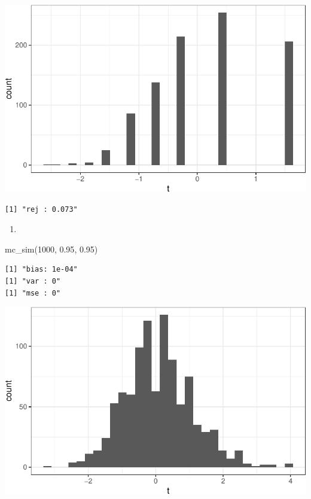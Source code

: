 \documentclass[
  letterpaper,
  DIV=11,
  numbers=noendperiod]{scrreprt}
\newenvironment{Shaded}{\begin{snugshade}}{\end{snugshade}}
\newcommand{\DecValTok}[1]{\textcolor[rgb]{0.68,0.00,0.00}{#1}}
\newcommand{\FloatTok}[1]{\textcolor[rgb]{0.68,0.00,0.00}{#1}}
\newcommand{\FunctionTok}[1]{\textcolor[rgb]{0.28,0.35,0.67}{#1}}
\newcommand{\NormalTok}[1]{\textcolor[rgb]{0.00,0.23,0.31}{#1}}
\providecommand{\tightlist}{%
  \setlength{\itemsep}{0pt}\setlength{\parskip}{0pt}}\usepackage{longtable,booktabs,array}
\begin{document}
\includegraphics{03-estimators_files/figure-pdf/unnamed-chunk-17-1.pdf}

\begin{verbatim}
[1] "rej : 0.073"
\end{verbatim}

\begin{enumerate}
\def\labelenumi{\arabic{enumi}.}
\setcounter{enumi}{9}
\tightlist
\item
\end{enumerate}

\begin{Shaded}
\begin{Highlighting}[]
\FunctionTok{mc\_sim}\NormalTok{(}\DecValTok{1000}\NormalTok{, }\FloatTok{0.95}\NormalTok{, }\FloatTok{0.95}\NormalTok{)}
\end{Highlighting}
\end{Shaded}

\begin{verbatim}
[1] "bias: 1e-04"
[1] "var : 0"
[1] "mse : 0"
\end{verbatim}

\includegraphics{03-estimators_files/figure-pdf/unnamed-chunk-18-1.pdf}
\end{document}
